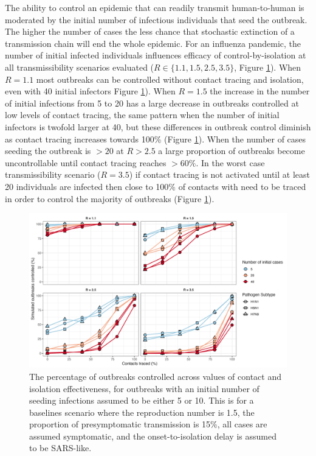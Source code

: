 \documentclass{article}
\begin{document}
The ability to control an epidemic that can readily transmit human-to-human is moderated by the initial number of infectious individuals that seed the outbreak. The higher the number of cases the less chance that stochastic extinction of a transmission chain will end the whole epidemic. For an influenza pandemic, the number of initial infected individuals influences efficacy of control-by-isolation at all transmissibility scenarios evaluated ($R \in \{1.1, 1.5, 2.5, 3.5\}$, Figure \ref{fig:prop-outbreak-control-num-init-cases}). When $R = 1.1$ most outbreaks can be controlled without contact tracing and isolation, even with 40 initial infectors Figure \ref{fig:prop-outbreak-control-num-init-cases}). When $R = 1.5$ the increase in the number of initial infections from 5 to 20 has a large decrease in outbreaks controlled at low levels of contact tracing, the same pattern when the number of initial infectors is twofold larger at 40, but these differences in outbreak control diminish as contact tracing increases towards 100\% (Figure \ref{fig:prop-outbreak-control-num-init-cases}). When the number of cases seeding the outbreak is $>20$ at $R>2.5$ a large proportion of outbreaks become uncontrollable until contact tracing reaches $>60\%$. In the worst case transmissibility scenario ($R = 3.5$) if contact tracing is not activated until at least 20 individuals are infected then close to 100\% of contacts with need to be traced in order to control the majority of outbreaks (Figure \ref{fig:prop-outbreak-control-num-init-cases}).  \\

\begin{figure}[ht]
\centering
\includegraphics[width=\textwidth]{../plots/prop_outbreak_control_num_init_cases.png}
\caption{The percentage of outbreaks controlled across values of contact and isolation effectiveness, for outbreaks with an initial number of seeding infections assumed to be either 5 or 10. This is for a baselines scenario where the reproduction number is 1.5, the proportion of presymptomatic transmission is 15\%, all cases are assumed symptomatic, and the onset-to-isolation delay is assumed to be SARS-like.}
\label{fig:prop-outbreak-control-num-init-cases}
\end{figure}
\end{document}
